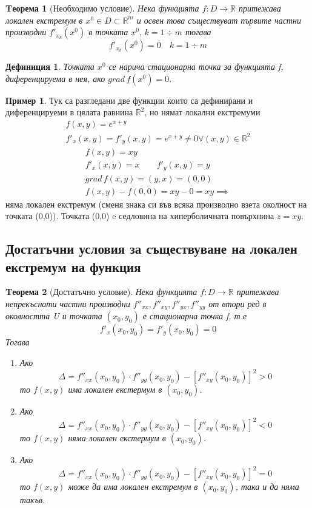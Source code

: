 \documentclass[a4paper,fleqn,12pt]{article}
\newtheorem{theorem}{Tеорема}[subsection]
\newtheorem{definition}{Дефиниция}[subsection]
\theoremstyle{definition}
\newtheorem{example}{Пример}[subsection]
\begin{document}
\begin{theorem}[Необходимо условие]
Нека функцията $f: D \to \mathbb{R}$ притежава локален екстремум в $x^0 \in D \subset \mathbb{R}^m$ и освен това съществуват първите частни производни $f'_{x_k}(x^0)$ в точката $x^0, \, k = 1 \div m$ тогава
$$f'_{x_k}(x^0) = 0 \quad  k = 1 \div m$$ 
\end{theorem}

\begin{definition}
Точката $x^0$ се нарича стационарна точка за функцията f, диференцируема в нея, ако $grad \, f(x^0) = 0$.
\end{definition}

\begin{example}
Тук са разгледани две функции които са дефинирани и диференцируеми в цялата равнина $\mathbb{R}^2$, но нямат локални екстремуми
\begin{gather*}
f(x,y) = e^{x+y}\\
f'_x(x,y) = f'_y(x,y) = e^{x+y} \neq 0 \forall (x,y) \in \mathbb{R}^2
\end{gather*}
\begin{gather*}
f(x,y) = xy \\
f'_x(x,y) = x \qquad f'_y(x,y) = y\\
grad\, f(x,y) = (y,x) = (0,0)\\
f(x,y) - f(0,0) = xy-0 = xy \implies 
\end{gather*}
няма локален екстремум (сменя знака си във всяка произволно взета околност на точката (0,0)). Точката (0,0) e седловина на хиперболичната повърхнина $z = xy$.
\end{example}

\subsection{Достатъчни условия за съществуване на локален екстремум на функция}

\begin{theorem}[Достатъчно условие]
Нека функцията $f: D \to \mathbb{R}$ притежава непрекъснати частни производни $ f''_{xx}, f''_{xy}, f''_{yx}, f''_{yy}$ от втори ред в околността U и точката $(x_0, y_0)$ е стационарна точка f, т.е
$$f'_x(x_0, y_0) = f'_y(x_0, y_0) = 0$$
Тогава 
\begin{enumerate}
\item Ако
$$\Delta = f''_{xx}(x_0, y_0) \cdot f''_{yy}(x_0, y_0) - \left[f''_{xy}(x_0, y_0)\right]^2 > 0$$
то $f(x, y)$ има локален екстермум в $(x_0, y_0)$. 
\item Ако
$$\Delta = f''_{xx}(x_0, y_0) \cdot f''_{yy}(x_0, y_0) - \left[f''_{xy}(x_0, y_0)\right]^2 < 0$$
то $f(x, y)$ няма локален екстермум в $(x_0, y_0)$. 
\item Ако
$$\Delta = f''_{xx}(x_0, y_0) \cdot f''_{yy}(x_0, y_0) - \left[f''_{xy}(x_0, y_0)\right]^2 = 0$$
то $f(x, y)$ може да има локален екстремум в $(x_0, y_0)$, така и да няма такъв. 
\end{enumerate}
\end{theorem}
\end{document}
